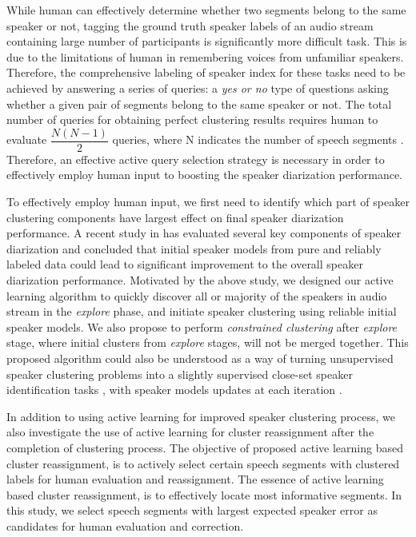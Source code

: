 \documentclass[journal,10pt]{IEEEtran}
\begin{document}
While human can effectively determine whether two segments belong to the same speaker or not, tagging the ground truth speaker labels of an audio stream containing large number of participants is significantly more difficult task. This is due to the limitations of human in remembering voices from unfamiliar speakers. Therefore, the comprehensive labeling of speaker index for these tasks need to be achieved by answering a series of queries: a \textit{yes or no} type of questions asking whether a given pair of segments belong to the same speaker or not. The total number of queries for obtaining perfect clustering results requires human to evaluate $\dfrac{N(N-1)}{2}$ queries, where N indicates the number of speech segments \cite{shum2014limited}. Therefore, an effective active query selection strategy is necessary in order to effectively employ human input to boosting the speaker diarization performance. 

To effectively employ human input, we first need to identify which part of speaker clustering components have largest effect on final speaker diarization performance. A recent study in \cite{sinclair2013challenges} has evaluated several key components of speaker diarization and concluded that initial speaker models from pure and reliably labeled data could lead to significant improvement to the overall speaker diarization performance.  Motivated by the above study, we designed our active learning algorithm to quickly discover all or majority of the speakers in audio stream in the \textit{explore} phase, and initiate speaker clustering using reliable initial speaker models. We also propose to perform \textit{constrained clustering} after \textit{explore} stage, where initial clusters from \textit{explore} stages, will not be merged together. This proposed algorithm could also be understood as a way of turning unsupervised speaker clustering problems into a slightly supervised close-set speaker identification tasks \cite{zhu2005combining}, with speaker models updates at each iteration .

In addition to using active learning for improved speaker clustering process, we also investigate the use of active learning for cluster reassignment after the completion of clustering process. The objective of proposed active learning based cluster reassignment, is to actively select certain speech segments with clustered labels for human evaluation and reassignment. The essence of active learning based cluster reassignment, is to effectively locate most informative segments. In this study, we select speech segments with largest expected speaker error as candidates for human evaluation and correction.
\end{document}
